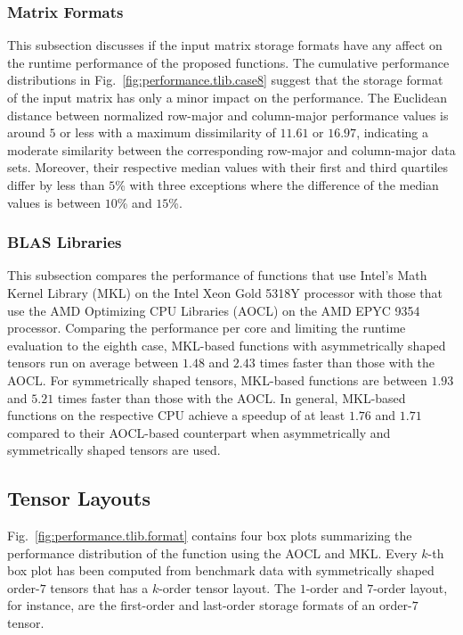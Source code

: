 \subsubsection{Matrix Formats}
This subsection discusses if the input matrix storage formats have any affect on the runtime performance of the proposed functions.
The cumulative performance distributions in Fig.~\ref{fig:performance.tlib.case8} suggest that the storage format of the input matrix has only a minor impact on the performance.
The Euclidean distance between normalized row-major and column-major performance values is around $5$ or less with a maximum dissimilarity of $11.61$ or $16.97$, indicating a moderate similarity between the corresponding row-major and column-major data sets.
Moreover, their respective median values with their first and third quartiles differ by less than $5$\% with three exceptions where the difference of the median values is between $10$\% and $15$\%.


\subsubsection{BLAS Libraries}
This subsection compares the performance of functions that use Intel's Math Kernel Library (MKL) on the Intel Xeon Gold 5318Y processor with those that use the AMD Optimizing CPU Libraries (AOCL) on the AMD EPYC 9354 processor. 
Comparing the performance per core and limiting the runtime evaluation to the eighth case, MKL-based functions with asymmetrically shaped tensors run on average between $1.48$ and $2.43$ times faster than those with the AOCL.
For symmetrically shaped tensors, MKL-based functions are between $1.93$ and $5.21$ times faster than those with the AOCL.
In general, MKL-based functions on the respective CPU achieve a speedup of at least $1.76$ and $1.71$ compared to their AOCL-based counterpart when asymmetrically and symmetrically shaped tensors are used.


\subsection{Tensor Layouts}
Fig.~\ref{fig:performance.tlib.format} contains four box plots summarizing the performance distribution of the  function using the AOCL and MKL.
Every $k$-th box plot has been computed from benchmark data with symmetrically shaped order-$7$ tensors that has a $k$-order tensor layout.
The $1$-order and $7$-order layout, for instance, are the first-order and last-order storage formats of an order-$7$ tensor.

